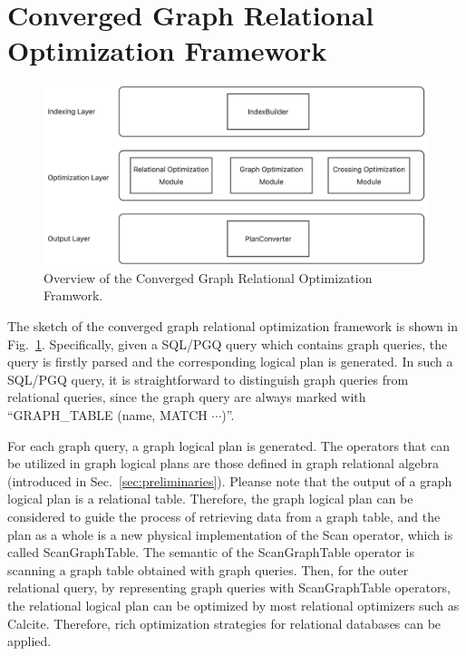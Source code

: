 \section{Converged Graph Relational Optimization Framework}

\begin{figure}
    \centering
    \includegraphics[width=\linewidth]{./figures/framework.png}
    \caption{Overview of the Converged Graph Relational Optimization Framwork.}
    \label{fig:framework-overview}
\end{figure}


The sketch of the converged graph relational optimization framework is shown in Fig.~\ref{fig:framework-overview}.
Specifically, given a SQL/PGQ query which contains graph queries, the query is firstly parsed and the corresponding logical plan is generated.
In such a SQL/PGQ query, it is straightforward to distinguish graph queries from relational queries, since the graph query are always marked with ``GRAPH\_TABLE (name, MATCH $\cdots$)''.

For each graph query, a graph logical plan is generated.
The operators that can be utilized in graph logical plans are those defined in graph relational algebra (introduced in Sec.~\ref{sec:preliminaries}).
Pleanse note that the output of a graph logical plan is a relational table.
Therefore, the graph logical plan can be considered to guide the process of retrieving data from a graph table, and the plan as a whole is a new physical implementation of the Scan operator, which is called ScanGraphTable.
The semantic of the ScanGraphTable operator is scanning a graph table obtained with graph queries.
Then, for the outer relational query, by representing graph queries with ScanGraphTable operators, the relational logical plan can be optimized by most relational optimizers such as Calcite.
Therefore, rich optimization strategies for relational databases can be applied.

